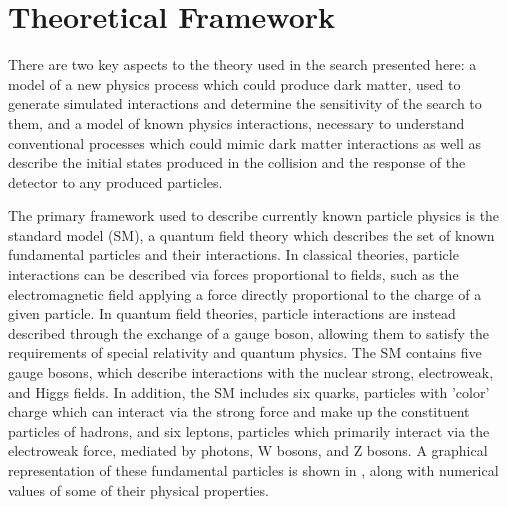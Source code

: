 \chapter{Theoretical Framework}
\label{theory}
There are two key aspects to the theory used in the search presented here: a model of a new physics process which could produce dark matter, used to generate simulated interactions and determine the sensitivity of the search to them, and a model of known physics interactions, necessary to understand conventional processes which could mimic dark matter interactions as well as describe the initial states produced in the collision and the response of the detector to any produced particles.

The primary framework used to describe currently known particle physics is the standard model (SM), a quantum field theory which describes the set of known fundamental particles and their interactions.
In classical theories, particle interactions can be described via forces proportional to fields, such as the electromagnetic field applying a force directly proportional to the charge of a given particle.
In quantum field theories, particle interactions are instead described through the exchange of a gauge boson, allowing them to satisfy the requirements of special relativity and quantum physics. 
The SM contains five gauge bosons, which describe interactions with the nuclear strong, electroweak, and Higgs fields.
In addition, the SM includes six quarks, particles with 'color' charge which can interact via the strong force and make up the constituent particles of hadrons, and six leptons, particles which primarily interact via the electroweak force, mediated by photons, W bosons, and Z bosons.
A graphical representation of these fundamental particles is shown in , along with numerical values of some of their physical properties.

